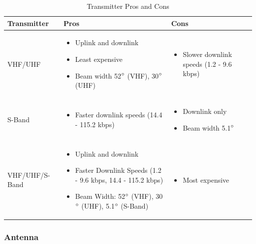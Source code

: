 \documentclass{ece}
\begin{document}
\begin{table}[H]
\centering
\begin{tabular}{|p{}|p{}|p{}|} 
\hline
\textbf{Transmitter} & \textbf{Pros} & \textbf{Cons}
\\
\hline
     VHF/UHF
     &
    \begin{itemize}
        \item Uplink and downlink
        \item Least expensive
        \item Beam width 52$\degree$ (VHF), 30$\degree$ (UHF)
    \end{itemize}
    &
    \begin{itemize}
        \item Slower downlink speeds (1.2 - 9.6 kbps)
    \end{itemize}
    \\
\hline
     S-Band
     &
    \begin{itemize}
        \item Faster downlink speeds (14.4 - 115.2 kbps)
    \end{itemize}
    &
        \begin{itemize}
        \item Downlink only
        \item Beam width 5.1$\degree$
    \end{itemize}
    \\
\hline
    VHF/UHF/S-Band
    &
    \begin{itemize}
        \item Uplink and downlink
        \item Faster Downlink Speeds (1.2 - 9.6 kbps, 14.4 - 115.2 kbps) 
        \item Beam Width: 52$\degree$ (VHF), 30$\degree$ (UHF), 5.1$\degree$ (S-Band)
    \end{itemize}
    &
    \begin{itemize}
        \item Most expensive
    \end{itemize}
    \\
\hline
\end{tabular}
\caption{Transmitter Pros and Cons \cite{isis_ground}}
\label{tbl:transmitter_procon}
\end{table}
\subsubsection{Antenna}
\end{document}

